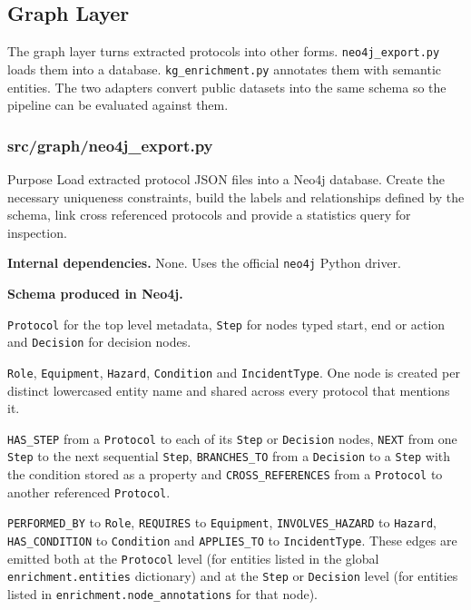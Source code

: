 \documentclass{article}
\begin{document}
\subsection{Graph Layer}

The graph layer turns extracted protocols into other forms.
\texttt{neo4j\_export.py} loads them into a database.
\texttt{kg\_enrichment.py} annotates them with semantic entities.
The two adapters convert public datasets into the same schema so the
pipeline can be evaluated against them.

\subsubsection{src/graph/neo4j\_export.py}

\begin{codeconceptbox}{Purpose}
Load extracted protocol JSON files into a Neo4j database. Create the
necessary uniqueness constraints, build the labels and relationships
defined by the schema, link cross referenced protocols and provide a
statistics query for inspection.
\end{codeconceptbox}

\textbf{Internal dependencies.} None. Uses the official
\texttt{neo4j} Python driver.

\textbf{Schema produced in Neo4j.}

\begin{description}[leftmargin=2em, style=nextline]
\item[\textbf{Core node labels.}]
\texttt{Protocol} for the top level metadata,
\texttt{Step} for nodes typed start, end or action and
\texttt{Decision} for decision nodes.
\item[\textbf{Entity node labels (when enrichment is present).}]
\texttt{Role}, \texttt{Equipment}, \texttt{Hazard},
\texttt{Condition} and \texttt{IncidentType}. One node is created
per distinct lowercased entity name and shared across every
protocol that mentions it.
\item[\textbf{Core relationship types.}]
\texttt{HAS\_STEP} from a \texttt{Protocol} to each of its
\texttt{Step} or \texttt{Decision} nodes,
\texttt{NEXT} from one \texttt{Step} to the next sequential
\texttt{Step},
\texttt{BRANCHES\_TO} from a \texttt{Decision} to a \texttt{Step}
with the condition stored as a property and
\texttt{CROSS\_REFERENCES} from a \texttt{Protocol} to another
referenced \texttt{Protocol}.
\item[\textbf{Entity relationship types.}]
\texttt{PERFORMED\_BY} to \texttt{Role},
\texttt{REQUIRES} to \texttt{Equipment},
\texttt{INVOLVES\_HAZARD} to \texttt{Hazard},
\texttt{HAS\_CONDITION} to \texttt{Condition} and
\texttt{APPLIES\_TO} to \texttt{IncidentType}. These edges are
emitted both at the \texttt{Protocol} level (for entities listed
in the global \texttt{enrichment.entities} dictionary) and at the
\texttt{Step} or \texttt{Decision} level (for entities listed in
\texttt{enrichment.node\_annotations} for that node).
\end{description}
\end{document}
